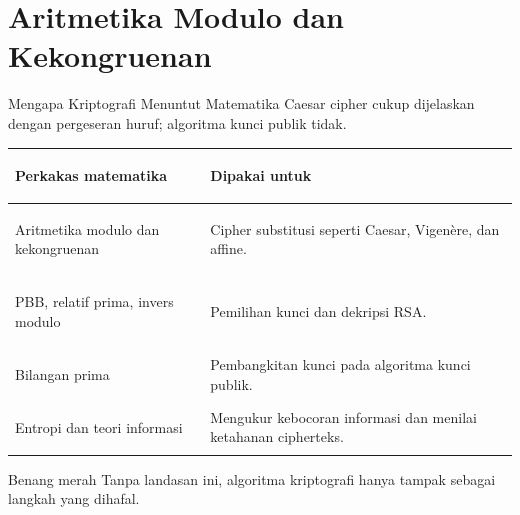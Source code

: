 \documentclass[aspectratio=169,11pt]{beamer}
\begin{document}
\section{Aritmetika Modulo dan Kekongruenan}

\begin{frame}{Mengapa Kriptografi Menuntut Matematika}
    Caesar cipher cukup dijelaskan dengan pergeseran huruf; algoritma kunci
    publik tidak.
    \vspace{0.1cm}
    \footnotesize
    \begin{tabularx}{\linewidth}{@{}>{\bfseries\raggedright\arraybackslash}p{4.8cm}
                                  >{\raggedright\arraybackslash}X@{}}
        \toprule
        Perkakas matematika & Dipakai untuk \\
        \midrule
        Aritmetika modulo dan kekongruenan & Cipher substitusi seperti Caesar,
        Vigen\`ere, dan affine. \\
        \addlinespace
        PBB, relatif prima, invers modulo & Pemilihan kunci dan dekripsi RSA. \\
        \addlinespace
        Bilangan prima & Pembangkitan kunci pada algoritma kunci publik. \\
        \addlinespace
        Entropi dan teori informasi & Mengukur kebocoran informasi dan menilai
        ketahanan cipherteks. \\
        \bottomrule
    \end{tabularx}
    \vspace{0.15cm}
    \begin{alertblock}{Benang merah}
        Tanpa landasan ini, algoritma kriptografi hanya tampak sebagai langkah
        yang dihafal.
    \end{alertblock}
\end{frame}
\end{document}
